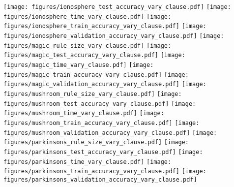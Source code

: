 \begin{figure*}[t]
\texttt{[image: figures/ionosphere\_test\_accuracy\_vary\_clause.pdf]}
\texttt{[image: figures/ionosphere\_time\_vary\_clause.pdf]}
\texttt{[image: figures/ionosphere\_train\_accuracy\_vary\_clause.pdf]}
\texttt{[image: figures/ionosphere\_validation\_accuracy\_vary\_clause.pdf]}
\texttt{[image: figures/magic\_rule\_size\_vary\_clause.pdf]}
\texttt{[image: figures/magic\_test\_accuracy\_vary\_clause.pdf]}
\texttt{[image: figures/magic\_time\_vary\_clause.pdf]}
\texttt{[image: figures/magic\_train\_accuracy\_vary\_clause.pdf]}
\texttt{[image: figures/magic\_validation\_accuracy\_vary\_clause.pdf]}
\texttt{[image: figures/mushroom\_rule\_size\_vary\_clause.pdf]}
\texttt{[image: figures/mushroom\_test\_accuracy\_vary\_clause.pdf]}
\texttt{[image: figures/mushroom\_time\_vary\_clause.pdf]}
\texttt{[image: figures/mushroom\_train\_accuracy\_vary\_clause.pdf]}
\texttt{[image: figures/mushroom\_validation\_accuracy\_vary\_clause.pdf]}
\texttt{[image: figures/parkinsons\_rule\_size\_vary\_clause.pdf]}
\texttt{[image: figures/parkinsons\_test\_accuracy\_vary\_clause.pdf]}
\texttt{[image: figures/parkinsons\_time\_vary\_clause.pdf]}
\texttt{[image: figures/parkinsons\_train\_accuracy\_vary\_clause.pdf]}
\texttt{[image: figures/parkinsons\_validation\_accuracy\_vary\_clause.pdf]}

\end{figure*}


